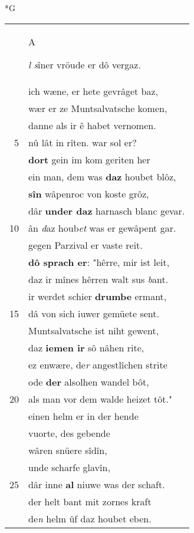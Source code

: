 \documentclass[8pt,a4paper,notitlepage]{article}
\begin{document}
\newpage
\begin{table}[ht]
\begin{minipage}[t]{0.5\linewidth}
\small
\begin{center}*G
\end{center}
\begin{tabular}{rl}
 & \begin{large}A\end{large}\textit{l} \textit{s}îner vröude er dô vergaz.\\ 
 & ich wæne, er hete gevrâget baz,\\ 
 & wær er ze Muntsalvatsche komen,\\ 
 & danne als ir ê habet vernomen.\\ 
5 & nû lât in rîten. war sol er?\\ 
 & \textbf{dort} gein im kom geriten her\\ 
 & ein man, dem was \textbf{daz} houbet blôz,\\ 
 & \textbf{sîn} wâpenroc von koste grôz,\\ 
 & dâr \textbf{under daz} harnasch blanc gevar.\\ 
10 & ân \textit{d}az houb\textit{et} was er gewâpent gar.\\ 
 & gegen Parzival er vaste reit.\\ 
 & \textbf{dô sprach er}: "hêrre, mir ist leit,\\ 
 & daz ir mînes hêrren walt sus \textit{b}ant.\\ 
 & ir werdet schier \textbf{drumbe} ermant,\\ 
15 & dâ von sich iuwer gemüete sent.\\ 
 & Muntsalvatsche ist niht gewent,\\ 
 & daz \textbf{iemen ir} sô nâhen rite,\\ 
 & ez enwære, de\textit{r} angestlîchen strite\\ 
 & ode \textbf{der} alsolhen wandel bôt,\\ 
20 & als man vor dem walde heizet tôt."\\ 
 & einen helm er in der hende\\ 
 & vuorte, des gebende\\ 
 & wâren snüere sîdîn,\\ 
 & unde scharfe glavîn,\\ 
25 & dâr inne \textbf{al} niuwe was der schaft.\\ 
 & der helt bant mit zornes kraft\\ 
 & de\textit{n} helm ûf daz houbet eben.\\ 

\end{tabular}
\end{minipage}
\end{table}
\end{document}
